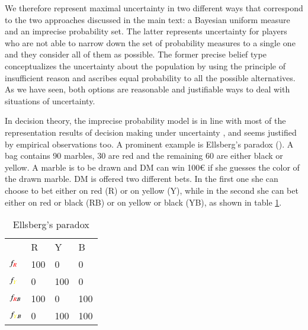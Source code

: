 \documentclass[fleqn,reqno,12pt]{article}
\theoremstyle{Satz}
\theoremstyle{Bsp}
\begin{document}
We therefore represent maximal uncertainty in two different ways that correspond to the two
approaches discussed in the main text: a Bayesian uniform measure and an imprecise probability
set. The latter represents uncertainty for players who are not able to narrow down the set of
probability measures to a single one and they consider all of them as possible. The former
precise belief type conceptualizes the uncertainty about the population by using the principle
of insufficient reason and ascribes equal probability to all the possible alternatives. As we
have seen, both options are reasonable and justifiable ways to deal with situations of
uncertainty.

In decision theory, the imprecise probability model is in line with most of the representation
results of decision making under uncertainty \citep[e.g.,][]{gilsch89,KlibMarMuk05,GhirMar02},
and seems justified by empirical observations too. A prominent example is Ellsberg's paradox
(\citet{ells61}). A bag contains 90 marbles, 30 are red and the remaining 60 are either black
or yellow. A marble is to be drawn and DM can win 100€ if she guesses the color of the drawn
marble. DM is offered two different bets. In the first one she can choose to bet either on
red (R) or on yellow (Y), while in the second she can bet either on red or black (RB) or on
yellow or black (YB), as shown in table \ref{Ellsberg}.



\begin{table}[h]
\centering
\begin{tabular}{@{}llll@{}}
\cmidrule(l){2-4}
\multicolumn{1}{c}{} & {\color{red}R}   & {\color{yellow}Y}   & B   \\ \cmidrule(l){2-4} 
$f_{{\color{red}R}}$              & 100 & 0   & 0   \\
$f_{{\color{yellow}Y}}$              & 0   & 100 & 0   \\
$f_{{\color{red}R}B}$            & 100 & 0   & 100 \\
$f_{{\color{yellow}Y}B}$             & 0   & 100 & 100 \\ \bottomrule
\end{tabular}
\caption{Ellsberg's paradox}
\label{Ellsberg}
\end{table}
\end{document}
